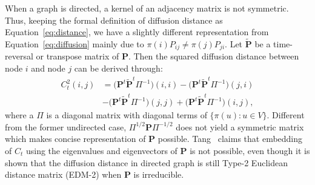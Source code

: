 \documentclass[11pt]{article}
\theoremstyle{definition}
\begin{document}
	When a graph is directed, a kernel of an adjacency matrix is not symmetric. Thus, keeping the formal definition of diffusion distance as Equation~\ref{eq:distance}, we have a slightly different representation from Equation~\ref{eq:diffusion} mainly due to $\pi(i) P_{ij} \neq \pi(j) P_{ji}$. Let $\tilde{\mathbf{P}}$ be a time-reversal or transpose matrix of $\mathbf{P}$. Then the squared diffusion distance between node $i$ and node $j$ can be derived through:
	\begin{equation}
	\begin{split}
	\label{eq:directed}
	C^2_{t}(i,j)  & = \big( \mathbf{P}^{t} \tilde{ \mathbf{P} }^{t} \Pi^{-1} \big)(i,i) - \big( \mathbf{P}^{t} \tilde{ \mathbf{P} }^{t} \Pi^{-1} \big)(j,i) \\ & - \big( \mathbf{P}^{t} \tilde{ \mathbf{P} }^{t} \Pi^{-1} \big)(j,j) + \big( \mathbf{P}^{t} \tilde{ \mathbf{P}}^{t} \Pi^{-1} \big) (i,j),
	\end{split}  
	\end{equation}
	where a $\Pi$ is a diagonal matrix with diagonal terms of $\{ \pi(u) : u \in V \}$. 
	Different from the former undirected case, $\Pi^{1/2} \mathbf{P} \Pi^{-1/2}$ does not yield a symmetric matrix which makes concise representation of $\mathbf{P}$ possible. Tang~\cite{tang2010graph} claims that embedding of $C_{t}$ using the eigenvalues and eigenvectors of $\mathbf{P}$ is not possible, even though it is shown that the diffusion distance in directed graph is still Type-2 Euclidean distance matrix (EDM-2) when $\mathbf{P}$ is irreducible. 
	
	\newpage
\end{document}
